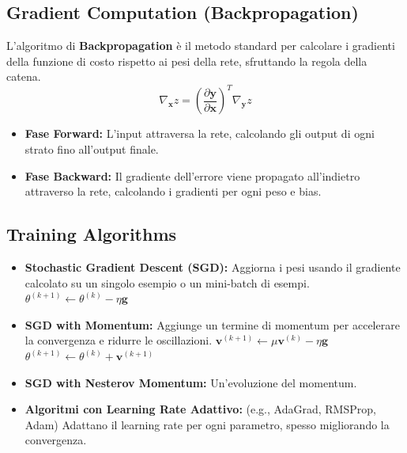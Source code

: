 \documentclass[a4paper,11pt]{article}
\begin{document}
\subsection{Gradient Computation (Backpropagation)}
L'algoritmo di \textbf{Backpropagation} è il metodo standard per calcolare i gradienti della funzione di costo rispetto ai pesi della rete, sfruttando la regola della catena.
\begin{equation}
    \nabla_{\mathbf{x}} z = \left( \frac{\partial \mathbf{y}}{\partial \mathbf{x}} \right)^T \nabla_{\mathbf{y}} z
\end{equation}
\begin{itemize}
    \item \textbf{Fase Forward:} L'input attraversa la rete, calcolando gli output di ogni strato fino all'output finale.
    \item \textbf{Fase Backward:} Il gradiente dell'errore viene propagato all'indietro attraverso la rete, calcolando i gradienti per ogni peso e bias.
\end{itemize}

\subsection{Training Algorithms}
\begin{itemize}
    \item \textbf{Stochastic Gradient Descent (SGD):} Aggiorna i pesi usando il gradiente calcolato su un singolo esempio o un mini-batch di esempi.
    $\theta^{(k+1)} \leftarrow \theta^{(k)} - \eta \mathbf{g}$
    \item \textbf{SGD with Momentum:} Aggiunge un termine di momentum per accelerare la convergenza e ridurre le oscillazioni.
    $\mathbf{v}^{(k+1)} \leftarrow \mu \mathbf{v}^{(k)} - \eta \mathbf{g}$ \\
    $\theta^{(k+1)} \leftarrow \theta^{(k)} + \mathbf{v}^{(k+1)}$
    \item \textbf{SGD with Nesterov Momentum:} Un'evoluzione del momentum.
    \item \textbf{Algoritmi con Learning Rate Adattivo:} (e.g., AdaGrad, RMSProp, Adam) Adattano il learning rate per ogni parametro, spesso migliorando la convergenza.
\end{itemize}
\end{document}
